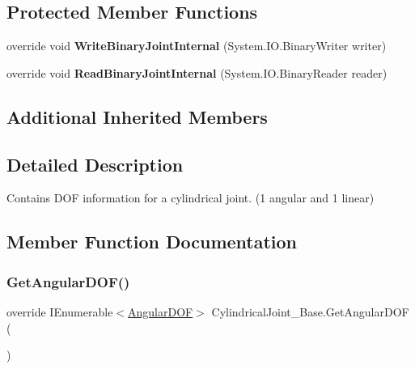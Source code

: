\subsection*{Protected Member Functions}
\begin{DoxyCompactItemize}
\item 
\mbox{\label{class_cylindrical_joint___base_ade950608be33bd1a4d9986d1789067b9}} 
override void {\bfseries Write\+Binary\+Joint\+Internal} (System.\+I\+O.\+Binary\+Writer writer)
\item 
\mbox{\label{class_cylindrical_joint___base_a2c5b9f4e9be175b9dabaf55fb150235e}} 
override void {\bfseries Read\+Binary\+Joint\+Internal} (System.\+I\+O.\+Binary\+Reader reader)
\end{DoxyCompactItemize}
\subsection*{Additional Inherited Members}


\subsection{Detailed Description}
Contains D\+OF information for a cylindrical joint. (1 angular and 1 linear) 



\subsection{Member Function Documentation}
\mbox{\label{class_cylindrical_joint___base_a9eba59edd9ac877a3be28e652b364b59}} 
\subsubsection{\texorpdfstring{Get\+Angular\+D\+O\+F()}{GetAngularDOF()}}
{\footnotesize\ttfamily override I\+Enumerable$<$\hyperlink{interface_angular_d_o_f}{Angular\+D\+OF}$>$ Cylindrical\+Joint\+\_\+\+Base.\+Get\+Angular\+D\+OF (\begin{DoxyParamCaption}{ }\end{DoxyParamCaption})\hspace{0.3cm}{\ttfamily [virtual]}}



